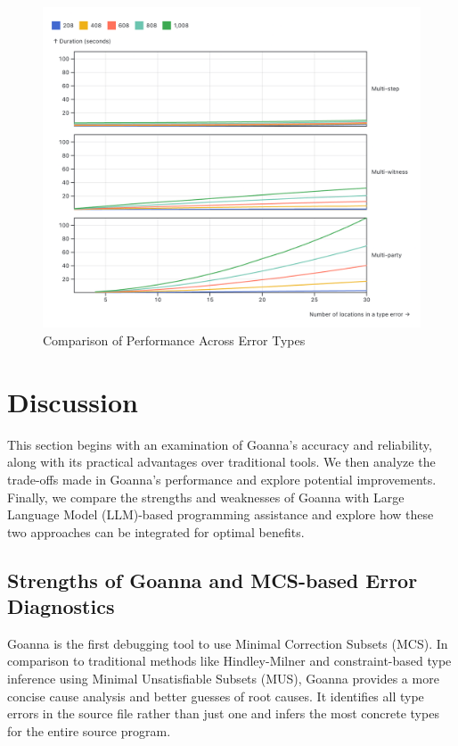 \documentclass[pdflatex,sn-mathphys-num]{sn-jnl}%
\begin{document}
\begin{figure}[ht]
    \centering
    \includegraphics[width=\linewidth]{images/compare-time.png}
    \caption{Comparison of Performance Across Error Types}
    \label{fig:compare-time}
\end{figure}


\section{Discussion} \label{sec:discussion}

This section begins with an examination of Goanna's accuracy and reliability, along with its practical advantages over traditional tools. We then analyze the trade-offs made in Goanna's performance and explore potential improvements. Finally, we compare the strengths and weaknesses of Goanna with Large Language Model (LLM)-based programming assistance and explore how these two approaches can be integrated for optimal benefits.

\subsection{Strengths of Goanna and MCS-based Error Diagnostics}

Goanna is the first debugging tool to use Minimal Correction Subsets (MCS). In comparison to traditional methods like Hindley-Milner and constraint-based type inference using Minimal Unsatisfiable Subsets (MUS), Goanna provides a more concise cause analysis and better guesses of root causes. It identifies all type errors in the source file rather than just one and infers the most concrete types for the entire source program.
\end{document}
